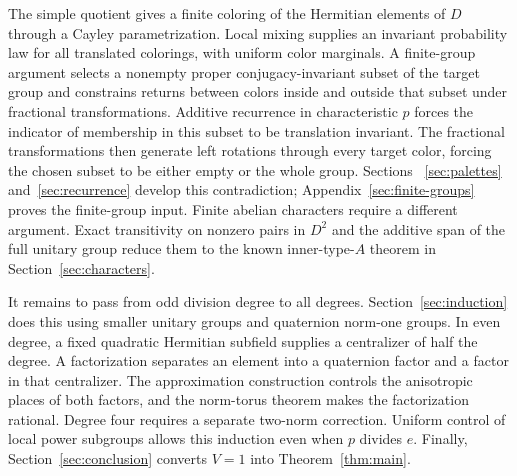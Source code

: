 The simple quotient gives a finite coloring of the Hermitian elements
of $D$ through a Cayley parametrization. Local mixing supplies an invariant
probability law for all translated colorings, with uniform color
marginals. A finite-group argument selects a nonempty proper conjugacy-invariant
subset of the target group and constrains returns between colors inside
and outside that subset under fractional transformations. Additive
recurrence in characteristic $p$ forces the indicator of membership in
this subset to be translation invariant. The fractional transformations
then generate left rotations through every target color, forcing the
chosen subset to be either empty or the whole group. Sections~
\ref{sec:palettes} and~\ref{sec:recurrence} develop this contradiction;
Appendix~\ref{sec:finite-groups} proves the finite-group input. Finite
abelian characters require a different argument. Exact transitivity on
nonzero pairs in $D^2$ and the additive span of the full unitary group reduce them to the known inner-type-$A$ theorem in
Section~\ref{sec:characters}.

It remains to pass from odd division degree to all degrees.
Section~\ref{sec:induction} does this using smaller unitary groups and
quaternion norm-one groups. In even degree, a fixed quadratic Hermitian
subfield supplies a centralizer of half the degree. A factorization
separates an element into a quaternion factor and a factor in that
centralizer. The approximation construction controls the anisotropic
places of both factors, and the norm-torus theorem makes the factorization
rational. Degree four requires a separate two-norm correction. Uniform
control of local power subgroups allows this induction even when
$p$ divides $e$. Finally, Section~\ref{sec:conclusion} converts $V=1$ into
Theorem~\ref{thm:main}.
